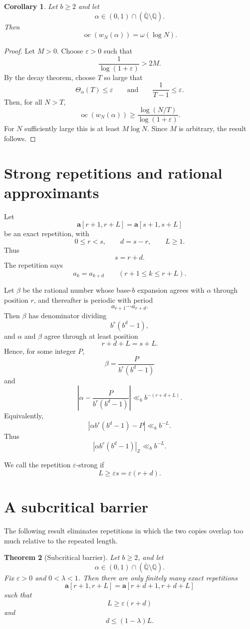 \documentclass[11pt]{amsart}
\newtheorem{theorem}{Theorem}[section]
\newtheorem{corollary}[theorem]{Corollary}
\DeclareMathOperator{\oc}{oc}
\newcommand{\normZ}[1]{\left|#1\right|_{\mathbb Z}}
\begin{document}
\begin{corollary}
Let \(b\geq 2\) and let
\[
\alpha\in(0,1)\cap(\overline{\mathbb Q}\setminus\mathbb Q).
\]
Then
\[
\oc(w_N(\alpha))=\omega(\log N).
\]
\end{corollary}

\begin{proof}
Let \(M>0\). Choose \(\varepsilon>0\) such that
\[
\frac{1}{\log(1+\varepsilon)}>2M.
\]
By the decay theorem, choose \(T\) so large that
\[
\Theta_\alpha(T)\leq \varepsilon
\qquad\text{and}\qquad
\frac{1}{T-1}\leq\varepsilon.
\]
Then, for all \(N>T\),
\[
\oc(w_N(\alpha))
\geq
\frac{\log(N/T)}{\log(1+\varepsilon)}.
\]
For \(N\) sufficiently large this is at least \(M\log N\). Since \(M\) is arbitrary, the result follows.
\end{proof}

\section{Strong repetitions and rational approximants}

Let
\[
\mathbf a[r+1,r+L]=\mathbf a[s+1,s+L]
\]
be an exact repetition, with
\[
0\leq r<s,
\qquad
d=s-r,
\qquad
L\geq1.
\]
Thus
\[
s=r+d.
\]
The repetition says
\[
a_k=a_{k+d}
\qquad(r+1\leq k\leq r+L).
\]

Let \(\beta\) be the rational number whose base-\(b\) expansion agrees with \(\alpha\) through position \(r\), and thereafter is periodic with period
\[
a_{r+1}\cdots a_{r+d}.
\]
Then \(\beta\) has denominator dividing
\[
b^r(b^d-1),
\]
and \(\alpha\) and \(\beta\) agree through at least position
\[
r+d+L=s+L.
\]
Hence, for some integer \(P\),
\[
\beta=\frac{P}{b^r(b^d-1)}
\]
and
\[
\left|\alpha-\frac{P}{b^r(b^d-1)}\right|
\ll_b
b^{-(r+d+L)}.
\]
Equivalently,
\[
\left|\alpha b^r(b^d-1)-P\right|
\ll_b
b^{-L}.
\]
Thus
\[
\normZ{\alpha b^r(b^d-1)}
\ll_b
b^{-L}.
\]

We call the repetition \(\varepsilon\)-strong if
\[
L\geq\varepsilon s=\varepsilon(r+d).
\]

\section{A subcritical barrier}

The following result eliminates repetitions in which the two copies overlap too much relative to the repeated length.

\begin{theorem}[Subcritical barrier]
Let \(b\geq 2\), and let
\[
\alpha\in(0,1)\cap(\overline{\mathbb Q}\setminus\mathbb Q).
\]
Fix \(\varepsilon>0\) and \(0<\lambda<1\). Then there are only finitely many exact repetitions
\[
\mathbf a[r+1,r+L]=\mathbf a[r+d+1,r+d+L]
\]
such that
\[
L\geq \varepsilon(r+d)
\]
and
\[
d\leq(1-\lambda)L.
\]
\end{theorem}
\end{document}
